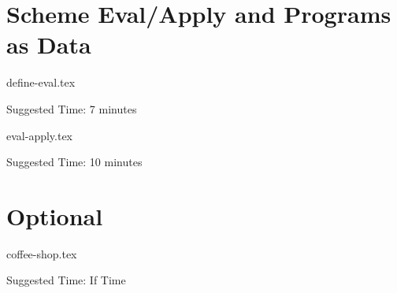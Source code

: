 \documentclass{exam}
\begin{document}
\section{Scheme Eval/Apply and Programs as Data}
\begin{questions}

    {define-eval.tex}
    \begin{questionmeta}
        Suggested Time: 7 minutes
    \end{questionmeta}

    {eval-apply.tex}
    \begin{questionmeta}
        Suggested Time: 10 minutes
    \end{questionmeta}

\end{questions}

\section{Optional}
\begin{questions}

    {coffee-shop.tex}
    \begin{questionmeta}
        Suggested Time: If Time
    \end{questionmeta}

\end{questions}
\end{document}
